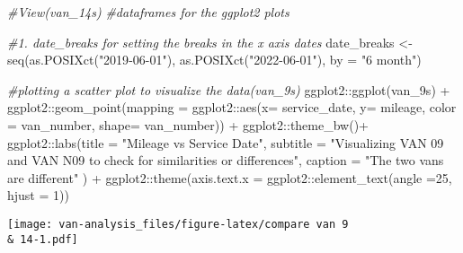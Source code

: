 \documentclass[
]{article}
\newenvironment{Shaded}{\begin{snugshade}}{\end{snugshade}}
\newcommand{\AttributeTok}[1]{\textcolor[rgb]{0.77,0.63,0.00}{#1}}
\newcommand{\CommentTok}[1]{\textcolor[rgb]{0.56,0.35,0.01}{\textit{#1}}}
\newcommand{\DecValTok}[1]{\textcolor[rgb]{0.00,0.00,0.81}{#1}}
\newcommand{\FunctionTok}[1]{\textcolor[rgb]{0.00,0.00,0.00}{#1}}
\newcommand{\NormalTok}[1]{#1}
\newcommand{\OtherTok}[1]{\textcolor[rgb]{0.56,0.35,0.01}{#1}}
\newcommand{\SpecialCharTok}[1]{\textcolor[rgb]{0.00,0.00,0.00}{#1}}
\newcommand{\StringTok}[1]{\textcolor[rgb]{0.31,0.60,0.02}{#1}}
\begin{document}
\begin{Shaded}
\begin{Highlighting}[]
\CommentTok{\#View(van\_14s)}
\CommentTok{\#dataframes for the ggplot2 plots}

\CommentTok{\#1. date\_breaks for setting the breaks in the x axis dates}
\NormalTok{date\_breaks }\OtherTok{\textless{}{-}} \FunctionTok{seq}\NormalTok{(}\FunctionTok{as.POSIXct}\NormalTok{(}\StringTok{"2019{-}06{-}01"}\NormalTok{), }\FunctionTok{as.POSIXct}\NormalTok{(}\StringTok{"2022{-}06{-}01"}\NormalTok{), }\AttributeTok{by =} \StringTok{"6 month"}\NormalTok{)}

\CommentTok{\#plotting a scatter plot to visualize the data(van\_9s)}
\NormalTok{ggplot2}\SpecialCharTok{::}\FunctionTok{ggplot}\NormalTok{(van\_9s) }\SpecialCharTok{+} 
\NormalTok{  ggplot2}\SpecialCharTok{::}\FunctionTok{geom\_point}\NormalTok{(}\AttributeTok{mapping =}\NormalTok{ ggplot2}\SpecialCharTok{::}\FunctionTok{aes}\NormalTok{(}\AttributeTok{x=}\NormalTok{ service\_date, }\AttributeTok{y=}\NormalTok{ mileage, }\AttributeTok{color =}\NormalTok{ van\_number, }\AttributeTok{shape=}\NormalTok{ van\_number)) }\SpecialCharTok{+}
\NormalTok{  ggplot2}\SpecialCharTok{::}\FunctionTok{theme\_bw}\NormalTok{()}\SpecialCharTok{+}
\NormalTok{  ggplot2}\SpecialCharTok{::}\FunctionTok{labs}\NormalTok{(}\AttributeTok{title =} \StringTok{"Mileage vs Service Date"}\NormalTok{, }\AttributeTok{subtitle =} \StringTok{"Visualizing VAN 09 and VAN N09 to check for similarities or differences"}\NormalTok{, }\AttributeTok{caption =} \StringTok{"The two vans are different"}\NormalTok{ ) }\SpecialCharTok{+} 
\NormalTok{  ggplot2}\SpecialCharTok{::}\FunctionTok{theme}\NormalTok{(}\AttributeTok{axis.text.x =}\NormalTok{ ggplot2}\SpecialCharTok{::}\FunctionTok{element\_text}\NormalTok{(}\AttributeTok{angle =}\DecValTok{25}\NormalTok{, }\AttributeTok{hjust =} \DecValTok{1}\NormalTok{))}
\end{Highlighting}
\end{Shaded}

\texttt{[image: van-analysis\_files/figure-latex/compare van 9 \\\& 14-1.pdf]}
\end{document}
